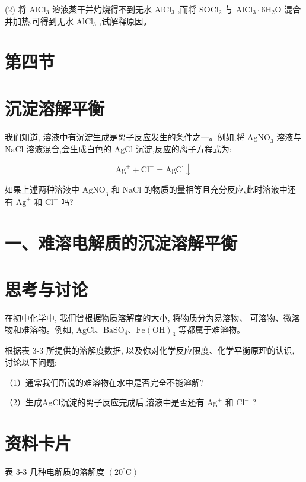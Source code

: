\documentclass[10pt]{article}
\begin{document}
(2) 将 \({\mathrm{{AlCl}}}_{3}\) 溶液蒸干并灼烧得不到无水 \({\mathrm{{AlCl}}}_{3}\) ,而将 \({\mathrm{{SOCl}}}_{2}\) 与 \({\mathrm{{AlCl}}}_{3} \cdot 6{\mathrm{H}}_{2}\mathrm{O}\) 混合并加热,可得到无水 \({\mathrm{{AlCl}}}_{3}\) ,试解释原因。

\section*{第四节}

\section*{沉淀溶解平衡}

我们知道, 溶液中有沉淀生成是离子反应发生的条件之一。例如,将 \({\mathrm{{AgNO}}}_{3}\) 溶液与 \(\mathrm{{NaCl}}\) 溶液混合,会生成白色的 \(\mathrm{{AgCl}}\) 沉淀,反应的离子方程式为:

\[
{\mathrm{{Ag}}}^{ + } + {\mathrm{{Cl}}}^{ - } = \mathrm{{AgCl}} \downarrow
\]

如果上述两种溶液中 \({\mathrm{{AgNO}}}_{3}\) 和 \(\mathrm{{NaCl}}\) 的物质的量相等且充分反应,此时溶液中还有 \({\mathrm{{Ag}}}^{ + }\) 和 \({\mathrm{{Cl}}}^{ - }\) 吗?

\section*{一、难溶电解质的沉淀溶解平衡}

\section*{思考与讨论}

在初中化学中, 我们曾根据物质溶解度的大小, 将物质分为易溶物、 可溶物、微溶物和难溶物。例如, \(\mathrm{{AgCl}}\text{、}{\mathrm{{BaSO}}}_{4}\text{、}\mathrm{{Fe}}{\left( \mathrm{{OH}}\right) }_{3}\) 等都属于难溶物。

根据表 3-3 所提供的溶解度数据, 以及你对化学反应限度、化学平衡原理的认识, 讨论以下问题:

（1）通常我们所说的难溶物在水中是否完全不能溶解?

（2）生成AgCl沉淀的离子反应完成后,溶液中是否还有 \({\mathrm{{Ag}}}^{ + }\) 和 \({\mathrm{{Cl}}}^{ - }\) ?

\section*{资料卡片}

表 3-3 几种电解质的溶解度 \(\left( {{20}^{ \circ }\mathrm{C}}\right)\)
\end{document}
